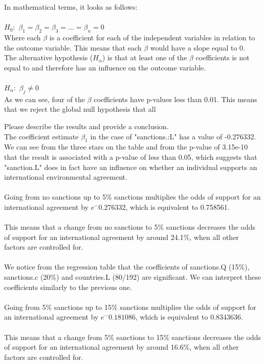 \documentclass[12pt,letterpaper]{article}
\begin{document}
\noindent In mathematical terms, it looks as follows:
\\\\
$H_0:$ $\beta_1 = \beta_2 = \beta_3 = ... = \beta_n = 0$
\\

\noindent Where each $\beta$ is a coefficient for each of the independent variables in relation to the outcome variable. This means that each $\beta$ would have a slope equal to 0.
\\

\noindent The alternative hypothesis ($H_\alpha$) is that at least one of the $\beta$ coefficients is not equal to and therefore has an influence on the outcome variable.
\\\\
$H_\alpha:$ $\beta_j \neq 0 $
\\

\noindent 
As we can see, four of the $\beta$ coefficients have p-values less than 0.01. This means that we reject the global null hypothesis that all 


\noindent Please describe the results and provide a conclusion.
\\

\noindent 
The coefficient estimate $\beta_1$ in the case of "sanctions.:L" has a value of -0.276332. We can see from the three stars on the table and from the p-value of 3.15e-10 that the result is associated with a p-value of less than 0.05, which suggests that "sanction.L" does in fact have an influence on whether an individual supports an international environmental agreement.
\\\\
\noindent
Going from no sanctions up to 5\% sanctions multiplies the odds of support for an international agreement by $e^-0.276332$, which is equivalent to 0.758561.
\\\\
\noindent 
This means that a change from no sanctions to 5\% sanctions decreases the odds of support for an international agreement by around 24.1\%, when all other factors are controlled for.
\\\\

\noindent We notice from the regression table that the coefficients of sanctions.Q (15\%), sanctions.c (20\%) and countries.L (80/192) are significant. We can interpret these coefficients similarly to the previous one. 
\\\\
\noindent
Going from 5\% sanctions up to 15\% sanctions multiplies the odds of support for an international agreement by $e^-0.181086$, which is equivalent to 0.8343636.
\\\\
\noindent 
This means that a change from 5\% sanctions to 15\% sanctions decreases the odds of support for an international agreement by around 16.6\%, when all other factors are controlled for.
\end{document}
